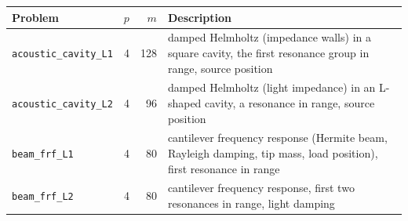 \begin{tabular}{lrrp{7.2cm}}
\toprule
Problem & $p$ & $m$ & Description \\
\midrule
\texttt{acoustic\_cavity\_L1} & 4 & 128 & damped Helmholtz (impedance walls) in a square cavity, the first resonance group in range, source position \\
\texttt{acoustic\_cavity\_L2} & 4 & 96 & damped Helmholtz (light impedance) in an L-shaped cavity, a resonance in range, source position \\
\texttt{beam\_frf\_L1} & 4 & 80 & cantilever frequency response (Hermite beam, Rayleigh damping, tip mass, load position), first resonance in range \\
\texttt{beam\_frf\_L2} & 4 & 80 & cantilever frequency response, first two resonances in range, light damping \\
\bottomrule
\end{tabular}
